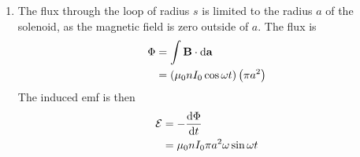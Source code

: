 \documentclass{homework}
\newcommand{\emf}{\mathcal{E}}
\begin{document}
\begin{enumerate}
\begin{enumerate}
			\item The flux through the loop of radius $s$ is limited to the radius $a$ of the solenoid, as the magnetic field is zero outside of $a$. The flux is \begin{align*}
				\Phi & = \int \boldsymbol{\mathrm{B}} \cdot \dd{ \boldsymbol{\mathrm{a}} } \\
					& = \left( \mu_0 n I_0 \cos \omega t\right) \left(\pi a^2\right)
			\end{align*}
			The induced emf is then \begin{align*}
				\emf & = - \dv{\Phi}{t} \\
					& = \mu_0 n I_0 \pi a^2 \omega \sin \omega t
			\end{align*}
		\end{enumerate}
	\end{enumerate}
\end{document}
